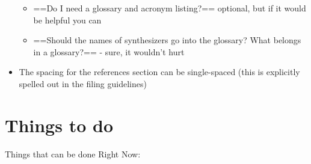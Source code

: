 \begin{itemize}
  \begin{itemize}
  \tightlist
  \item
    ==Do I need a glossary and acronym listing?== optional, but if it
    would be helpful you can
  \item
    ==Should the names of synthesizers go into the glossary? What
    belongs in a glossary?== - sure, it wouldn't hurt
  \end{itemize}
\item
  The spacing for the references section can be single-spaced (this is
  explicitly spelled out in the filing guidelines)
\end{itemize}

\section{Things to do}\label{things-to-do}

Things that can be done Right Now:

